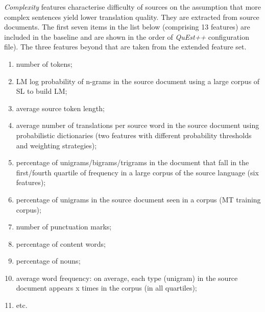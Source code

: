 \textit{Complexity} features characterise difficulty of sources on the assumption that more complex sentences yield lower translation quality. They are extracted from source documents. The first seven items in the list below (comprising 13 features) are included in the baseline and are shown in the order of \textit{QuEst++} configuration file). The three features beyond that are taken from the extended feature set.  
\begin{enumerate}\compresslist{}
	\item number of tokens;
	\item LM log probability of n-grams in the source document using a large corpus of SL to build LM;
	\item average source token length;
	\item average number of translations per source word in the source document using probabilistic dictionaries  (two features with different probability thresholds and weighting strategies);
	\item percentage of unigrams/bigrams/trigrams in the document that fall in the first/fourth quartile of frequency in a large corpus of the source language (six features);
	\item percentage of unigrams in the source document seen in a corpus (MT training corpus);
	\item number of punctuation marks;
	\item percentage of content words;
	\item percentage of nouns;
	\item average word frequency: on average, each type (unigram) in the source document appears x times in the corpus (in all quartiles);
	\item etc.
\end{enumerate}

